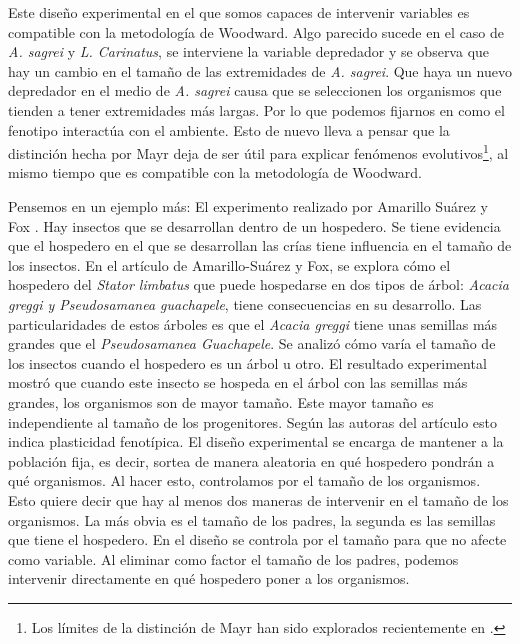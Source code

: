 \begin{center}
\end{center}

Este diseño experimental en el que somos capaces de intervenir variables es compatible con la metodología de Woodward. Algo parecido sucede en el caso de \emph{A. sagrei} y \emph{L. Carinatus}, se interviene la variable depredador y se observa que hay un cambio en el tamaño de las extremidades de \emph{A. sagrei}. Que haya un nuevo depredador en el medio de \emph{A. sagrei} causa que se seleccionen los organismos que tienden a tener extremidades más largas. Por lo que podemos fijarnos en como el fenotipo interactúa con el ambiente. Esto de nuevo lleva a pensar que la distinción hecha por Mayr deja de ser útil para explicar fenómenos evolutivos\footnote{Los límites de la distinción de Mayr han sido explorados recientemente en \cite{Uller2020, Dayan2020, Laland2011}.}, al mismo tiempo que es compatible con la metodología de Woodward.

Pensemos en un ejemplo más: El experimento realizado por Amarillo Suárez y Fox \citeyear{Amarillo-Suarez2006}. Hay insectos que se desarrollan dentro de un hospedero. Se tiene evidencia que el hospedero en el que se desarrollan las crías tiene influencia en el tamaño de los insectos. En el artículo de Amarillo-Suárez y Fox, se explora cómo el hospedero del \emph{Stator limbatus} que puede hospedarse en dos tipos de árbol: \emph{Acacia greggi y Pseudosamanea guachapele}, tiene consecuencias en su desarrollo. Las particularidades de estos árboles es que el \emph{Acacia greggi} tiene unas semillas más grandes que el \emph{Pseudosamanea Guachapele}. Se analizó cómo varía el tamaño de los insectos cuando el hospedero es un árbol u otro. El resultado experimental mostró que cuando este insecto se hospeda en el árbol con las semillas más grandes, los organismos son de mayor tamaño. Este mayor tamaño es independiente al tamaño de los progenitores. Según las autoras del artículo esto indica plasticidad fenotípica. El diseño experimental se encarga de mantener a la población fija, es decir, sortea de manera aleatoria en qué hospedero pondrán a qué organismos. Al hacer esto, controlamos por el tamaño de los organismos. Esto quiere decir que hay al menos dos maneras de intervenir en el tamaño de los organismos. La más obvia es el tamaño de los padres, la segunda es las semillas que tiene el hospedero. En el diseño se controla por el tamaño para que no afecte como variable. Al eliminar como factor el tamaño de los padres, podemos intervenir directamente en qué hospedero poner a los organismos.

